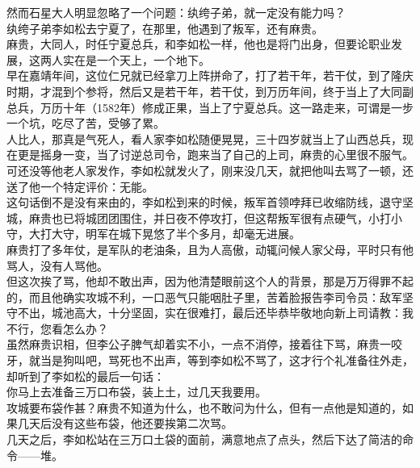 \begin{multicols}{\theparacolNo}
然而石星大人明显忽略了一个问题：纨绔子弟，就一定没有能力吗？\\

纨绔子弟李如松去宁夏了，在那里，他遇到了叛军，还有麻贵。\\

麻贵，大同人，时任宁夏总兵，和李如松一样，他也是将门出身，但要论职业发展，这两人实在是一个天上，一个地下。\\

早在嘉靖年间，这位仁兄就已经拿刀上阵拼命了，打了若干年，若干仗，到了隆庆时期，才混到个参将，然后又是若干年，若干仗，到万历年间，终于当上了大同副总兵，万历十年（1582年）修成正果，当上了宁夏总兵。这一路走来，可谓是一步一个坑，吃尽了苦，受够了累。\\

人比人，那真是气死人，看人家李如松随便晃晃，三十四岁就当上了山西总兵，现在更是摇身一变，当了讨逆总司令，跑来当了自己的上司，麻贵的心里很不服气。\\

可还没等他老人家发作，李如松就发火了，刚来没几天，就把他叫去骂了一顿，还送了他一个特定评价：无能。\\

这句话倒不是没有来由的，李如松到来的时候，叛军首领哱拜已收缩防线，退守坚城，麻贵也已将城团团围住，并日夜不停攻打，但这帮叛军很有点硬气，小打小守，大打大守，明军在城下晃悠了半个多月，却毫无进展。\\

麻贵打了多年仗，是军队的老油条，且为人高傲，动辄问候人家父母，平时只有他骂人，没有人骂他。\\

但这次挨了骂，他却不敢出声，因为他清楚眼前这个人的背景，那是万万得罪不起的，而且他确实攻城不利，一口恶气只能咽肚子里，苦着脸报告李司令员：敌军坚守不出，城池高大，十分坚固，实在很难打，最后还毕恭毕敬地向新上司请教：我不行，您看怎么办？\\

虽然麻贵识相，但李公子脾气却着实不小，一点不消停，接着往下骂，麻贵一咬牙，就当是狗叫吧，骂死也不出声，等到李如松不骂了，这才行个礼准备往外走，却听到了李如松的最后一句话：\\

你马上去准备三万口布袋，装上土，过几天我要用。\\

攻城要布袋作甚？麻贵不知道为什么，也不敢问为什么，但有一点他是知道的，如果几天后没有这些布袋，他还要挨第二次骂。\\

几天之后，李如松站在三万口土袋的面前，满意地点了点头，然后下达了简洁的命令——堆。\\


\end{multicols}
